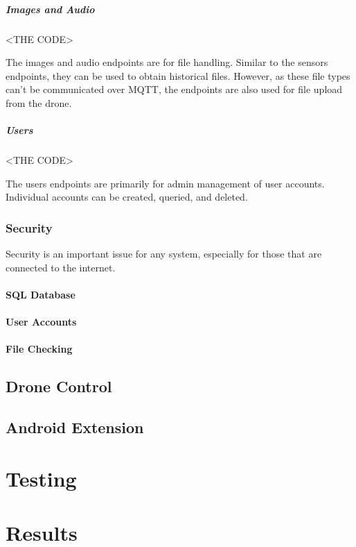 \documentclass{article}
\begin{document}
\subparagraph{Images and Audio}
\begin{center}
	<THE CODE>
\end{center}
The images and audio endpoints are for file handling. Similar to the sensors endpoints, they can be used to obtain historical files. However, as these file types can't be communicated over MQTT, the endpoints are also used for file upload from the drone. 

\subparagraph{Users}
\begin{center}
	<THE CODE>
\end{center}
The users endpoints are primarily for admin management of user accounts. Individual accounts can be created, queried, and deleted. 


\subsubsection{Security}
Security is an important issue for any system, especially for those that are connected to the internet. 
\paragraph{SQL Database}
\paragraph{User Accounts}
\paragraph{File Checking}

\subsection{Drone Control}

\subsection{Android Extension}

\section{Testing}



\section{Results}
\end{document}
